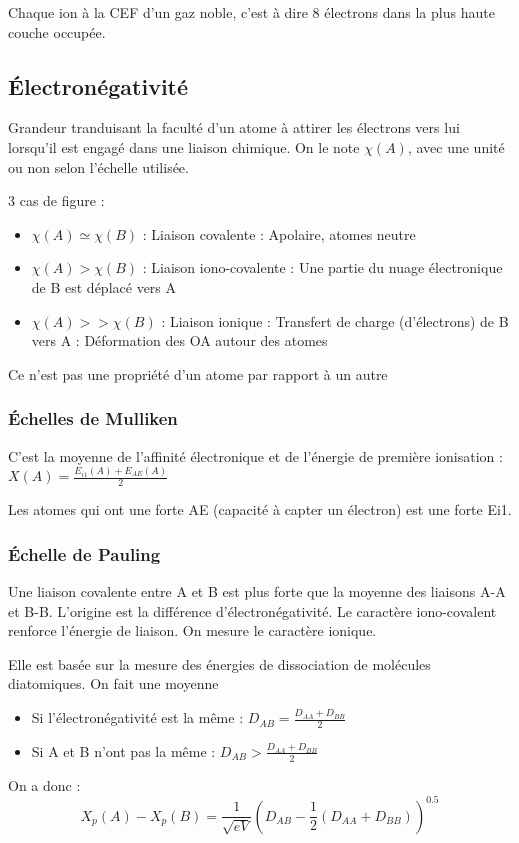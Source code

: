 \documentclass[french]{yLectureNote}
\begin{document}
Chaque ion à la CEF d'un gaz noble, c'est à dire 8 électrons dans la plus haute couche occupée.
\subsection{Électronégativité}
Grandeur tranduisant la faculté d'un atome à attirer les électrons vers lui lorsqu'il est engagé dans une liaison chimique.
On le note $\chi(A)$, avec une unité ou non selon l'échelle utilisée.

3 cas de figure :
\begin{itemize}
 \item $\chi(A)\simeq\chi(B)$ : Liaison covalente : Apolaire, atomes neutre
 \item $\chi(A)>\chi(B)$ : Liaison iono-covalente : Une partie du nuage électronique de B est déplacé vers A
  \item $\chi(A)>>\chi(B)$ : Liaison ionique : Transfert de charge (d'électrons) de B vers A : Déformation des OA autour des atomes
\end{itemize}
Ce n'est pas une propriété d'un atome par rapport à un autre
\subsubsection{Échelles de Mulliken}
C'est la moyenne de l'affinité électronique et de l'énergie de première ionisation : $X(A) = \frac{E_{i1}(A)+E_{AE}(A)}{2}$

Les atomes qui ont une forte AE (capacité à capter un électron) est une forte Ei1.
\subsubsection{Échelle de Pauling}
Une liaison covalente entre A et B est plus forte que la moyenne des liaisons A-A et B-B. L'origine est la différence d'électronégativité. Le caractère iono-covalent renforce l'énergie de liaison. On mesure le caractère ionique.

Elle est basée sur la mesure des énergies de dissociation de molécules diatomiques. On fait une moyenne

\begin{itemize}
 \item Si l'électronégativité est la m\^eme : $D_{AB} = \frac{D_{AA}+D_{BB}}{2}$
  \item Si A et B n'ont pas la m\^eme : $D_{AB} > \frac{D_{AA}+D_{BB}}{2}$
\end{itemize}
On a donc :
\[X_p(A)-X_p(B) = \frac{1}{\sqrt{eV}}(D_{AB}-\frac{1}{2}(D_{AA}+D_{BB}))^{0.5}\]
\end{document}
